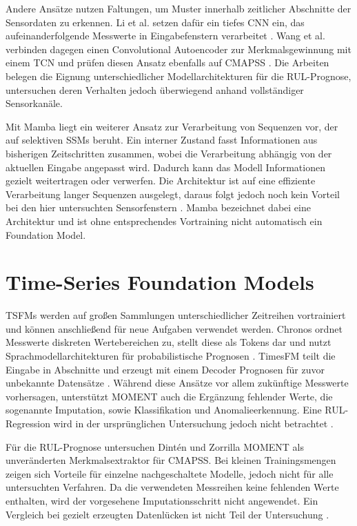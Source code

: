 Andere Ansätze nutzen Faltungen, um Muster innerhalb zeitlicher Abschnitte der Sensordaten zu erkennen. Li et al. setzen dafür ein tiefes \ac{CNN} ein, das aufeinanderfolgende Messwerte in Eingabefenstern verarbeitet \parencite{liRemainingUsefulLife2018}. Wang et al. verbinden dagegen einen Convolutional Autoencoder zur Merkmalsgewinnung mit einem \ac{TCN} und prüfen diesen Ansatz ebenfalls auf \ac{CMAPSS} \parencite[6--10]{wangRemainingUsefulLife2020}. Die Arbeiten belegen die Eignung unterschiedlicher Modellarchitekturen für die \ac{RUL}-Prognose, untersuchen deren Verhalten jedoch überwiegend anhand vollständiger Sensorkanäle.

Mit Mamba liegt ein weiterer Ansatz zur Verarbeitung von Sequenzen vor, der auf selektiven \acp{SSM} beruht. Ein interner Zustand fasst Informationen aus bisherigen Zeitschritten zusammen, wobei die Verarbeitung abhängig von der aktuellen Eingabe angepasst wird. Dadurch kann das Modell Informationen gezielt weitertragen oder verwerfen. Die Architektur ist auf eine effiziente Verarbeitung langer Sequenzen ausgelegt, daraus folgt jedoch noch kein Vorteil bei den hier untersuchten Sensorfenstern \parencite[Abschn.~3]{guMambaLinearTimeSequence2024}. Mamba bezeichnet dabei eine Architektur und ist ohne entsprechendes Vortraining nicht automatisch ein Foundation Model.

\newpage
\section{Time-Series Foundation Models}

\acp{TSFM} werden auf großen Sammlungen unterschiedlicher Zeitreihen vortrainiert und können anschließend für neue Aufgaben verwendet werden. Chronos ordnet Messwerte diskreten Wertebereichen zu, stellt diese als Tokens dar und nutzt Sprachmodellarchitekturen für probabilistische Prognosen \parencite{ansariChronosLearningLanguage}. TimesFM teilt die Eingabe in Abschnitte und erzeugt mit einem Decoder Prognosen für zuvor unbekannte Datensätze \parencite{dasDecoderonlyFoundationModel2024}. Während diese Ansätze vor allem zukünftige Messwerte vorhersagen, unterstützt MOMENT auch die Ergänzung fehlender Werte, die sogenannte Imputation, sowie Klassifikation und Anomalieerkennung. Eine \ac{RUL}-Regression wird in der ursprünglichen Untersuchung jedoch nicht betrachtet \parencite[3--5]{goswamiMOMENTFamilyOpen2024}.

Für die \ac{RUL}-Prognose untersuchen Dintén und Zorrilla MOMENT als unveränderten Merkmalsextraktor für \ac{CMAPSS}. Bei kleinen Trainingsmengen zeigen sich Vorteile für einzelne nachgeschaltete Modelle, jedoch nicht für alle untersuchten Verfahren. Da die verwendeten Messreihen keine fehlenden Werte enthalten, wird der vorgesehene Imputationsschritt nicht angewendet. Ein Vergleich bei gezielt erzeugten Datenlücken ist nicht Teil der Untersuchung \parencite[Abschn.~4.3 und 5]{dintenUsingTimeSeries2025}.

